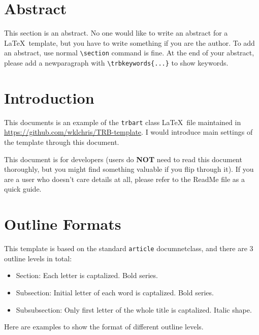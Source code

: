 \documentclass[12pt]{trbart}
\begin{document}
\linenumbers%
\maketitle

\section{Abstract}

This section is an abstract. No one would like to write an abstract for a \LaTeX\ template, but you have to write something if you are the author. To add an abstract, use normal \verb+\section+ command is fine. At the end of your abstract, please add a newparagraph with \verb+\trbkeywords{...}+ to show keywords.



\section{Introduction}
This documents is an example of the \texttt{trbart} class \LaTeX\ file maintained in \url{https://github.com/wklchris/TRB-template}. I would introduce main settings of the template through this document.

This document is for developers (users do \textbf{NOT} need to read this document thoroughly, but you might find something valuable if you flip through it). If you are a user who doesn't care details at all, please refer to the ReadMe file as a quick guide.


\section{Outline Formats}
This template is based on the standard \texttt{article} documnetclass, and there are 3 outline levels in total:
\begin{itemize}
    \item Section: Each letter is captalized. Bold series.
    \item Subsection: Initial letter of each word is captalized. Bold series.
    \item Subsubsection: Only first letter of the whole title is captalized. Italic shape.
\end{itemize}

Here are examples to show the format of different outline levels.
\end{document}

